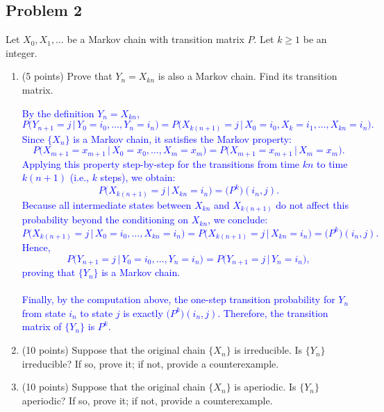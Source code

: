 \documentclass{article}
\begin{document}
\subsection*{Problem 2} Let $X_0, X_1, \dots$ be a Markov chain with transition matrix $P$. Let $k \geq 1$ be an integer.
    \begin{enumerate}
        \item (5 points) Prove that $Y_n = X_{kn}$ is also a Markov chain. Find its transition matrix.

            \textcolor{blue}{
By the definition $Y_n = X_{kn}$,
\[
P\bigl(Y_{n+1} = j \,\big\vert\, Y_0 = i_0, \dots, Y_n = i_n\bigr)
= P\bigl(X_{k(n+1)} = j \,\big\vert\, X_{0} = i_0, X_k = i_1, \dots, X_{kn} = i_n\bigr).
\]
Since $\{X_n\}$ is a Markov chain, it satisfies the Markov property:
\[
P\bigl(X_{m+1} = x_{m+1} \,\big\vert\, X_0 = x_0, \dots, X_m = x_m\bigr)
= P\bigl(X_{m+1} = x_{m+1} \,\big\vert\, X_m = x_m\bigr).
\]
Applying this property step-by-step for the transitions from time $kn$ to time $k(n+1)$ (i.e., $k$ steps), we obtain:
\[
P\bigl(X_{k(n+1)} = j \,\big\vert\, X_{kn} = i_n\bigr) = \bigl(P^k\bigr)(i_n, j).
\]
Because all intermediate states between $X_{kn}$ and $X_{k(n+1)}$ do not affect this probability beyond the conditioning on $X_{kn}$, we conclude:
\[
P\bigl(X_{k(n+1)} = j \,\big\vert\, X_{0} = i_0, \dots, X_{kn} = i_n\bigr)
= P\bigl(X_{k(n+1)} = j \,\big\vert\, X_{kn} = i_n\bigr)
= \bigl(P^k\bigr)(i_n, j).
\]
Hence,
\[
P\bigl(Y_{n+1} = j \,\big\vert\, Y_0 = i_0, \dots, Y_n = i_n\bigr)
= P\bigl(Y_{n+1} = j \,\big\vert\, Y_n = i_n\bigr),
\]
proving that $\{Y_n\}$ is a Markov chain. \\ \\
Finally, by the computation above, the one-step transition probability for $Y_n$ from state $i_n$ to state $j$ is exactly $\bigl(P^k\bigr)(i_n, j)$. Therefore, the transition matrix of $\{Y_n\}$ is $P^k$.
}

        
        \item (10 points) Suppose that the original chain $\{X_n\}$ is irreducible. Is $\{Y_n\}$ irreducible? If so, prove it; if not, provide a counterexample.

            \textcolor{blue}{}

        
        \item (10 points) Suppose that the original chain $\{X_n\}$ is aperiodic. Is $\{Y_n\}$ aperiodic? If so, prove it; if not, provide a counterexample.

            \textcolor{blue}{}
        

\end{enumerate}
\end{document}
